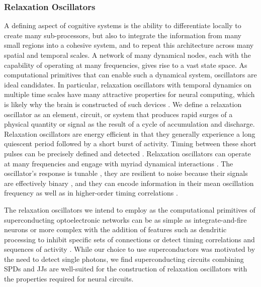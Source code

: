 \documentclass[aip,amsmath,amssymb,reprint,nofootinbib]{revtex4-1}
\begin{document}
\subsubsection{Relaxation Oscillators}
A defining aspect of cognitive systems is the ability to differentiate locally to create many sub-processors, but also to integrate the information from many small regions into a cohesive system, and to repeat this architecture across many spatial and temporal scales. A network of many dynamical nodes, each with the capability of operating at many frequencies, gives rise to a vast state space. As computational primitives that can enable such a dynamical system, oscillators are ideal candidates. In particular, relaxation oscillators \cite{st2015,mist1990,soko1993,lued1997,huya2000,bu2006,gile2011,vepe1968,cacl1981} with temporal dynamics on multiple time scales \cite{soko1993} have many attractive properties for neural computing, which is likely why the brain is constructed of such devices \cite{ll1988}. We define a relaxation oscillator as an element, circuit, or system that produces rapid surges of a physical quantity or signal as the result of a cycle of accumulation and discharge. Relaxation oscillators are energy efficient in that they generally experience a long quiescent period followed by a short burst of activity. Timing between these short pulses can be precisely defined and detected \cite{bu2006}. Relaxation oscillators can operate at many frequencies \cite{huya2000} and engage with myriad dynamical interactions \cite{lued1997}. The oscillator's response is tunable \cite{huya2000}, they are resilient to noise because their signals are effectively binary \cite{stgo2005}, and they can encode information in their mean oscillation frequency as well as in higher-order timing correlations \cite{pasc1999,thde2001,sase2001,stse2007,brcl2010,haah2015}.

The relaxation oscillators we intend to employ as the computational primitives of superconducting optoelectronic networks can be as simple as integrate-and-fire neurons \cite{daab2001,geki2002} or more complex with the addition of features such as dendritic processing \cite{thde2001,sase2001,stse2007,brcl2010,haah2015} to inhibit specific sets of connections \cite{budr2004,bu2006,robu2015} or detect timing correlations and sequences of activity \cite{sase2001,haah2015}. While our choice to use superconductors was motivated by the need to detect single photons, we find superconducting circuits combining SPDs and JJs are well-suited for the construction of relaxation oscillators with the properties required for neural circuits.
\end{document}

